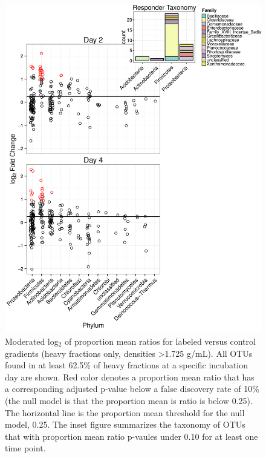 \begin{figure}[h!]
  \centering
    \includegraphics[width=1.0\textwidth]{figures/l2fc1/l2fc_stacked_w_inset.png}
  \caption{Moderated log$_{2}$ of proportion mean ratios for labeled versus control gradients (heavy fractions only, densities >1.725 g/mL). All OTUs found in at least 62.5\% of heavy fractions at a specific incubation day are shown. Red color denotes a proportion mean ratio that has a corresponding adjusted p-value below a false discovery rate of 10\% (the null model is that the proportion mean is ratio is below 0.25). The horizontal line is the proportion mean threshold for the null model, 0.25. The inset figure summarizes the taxonomy of OTUs that with proportion mean ratio p-vaules under 0.10 for at least one time point.}
  \label{fig:l2fc}
\end{figure}


